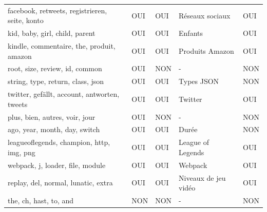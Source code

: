\begin{longtable}{lllll}
\scriptsize facebook, retweets, registrieren, seite, konto     & \cellcolor[HTML]{9AFF99}OUI & \cellcolor[HTML]{9AFF99}OUI & Réseaux sociaux           & \cellcolor[HTML]{9AFF99}OUI \\
\scriptsize kid, baby, girl, child, parent                     & \cellcolor[HTML]{9AFF99}OUI & \cellcolor[HTML]{9AFF99}OUI & Enfants                   & \cellcolor[HTML]{9AFF99}OUI \\
\scriptsize kindle, commentaire, the, produit, amazon          & \cellcolor[HTML]{9AFF99}OUI & \cellcolor[HTML]{9AFF99}OUI & Produits Amazon           & \cellcolor[HTML]{9AFF99}OUI \\
\scriptsize root, size, review, id, common                     & \cellcolor[HTML]{9AFF99}OUI & \cellcolor[HTML]{FFCCC9}NON & -                         & \cellcolor[HTML]{FFCCC9}NON \\
\scriptsize string, type, return, class, json                  & \cellcolor[HTML]{9AFF99}OUI & \cellcolor[HTML]{9AFF99}OUI & Types JSON                & \cellcolor[HTML]{FFCCC9}NON \\
\scriptsize twitter, gefällt, account, antworten, tweets       & \cellcolor[HTML]{9AFF99}OUI & \cellcolor[HTML]{9AFF99}OUI & Twitter                   & \cellcolor[HTML]{9AFF99}OUI \\
\scriptsize plus, bien, autres, voir, jour                     & \cellcolor[HTML]{9AFF99}OUI & \cellcolor[HTML]{FFCCC9}NON & -                         & \cellcolor[HTML]{FFCCC9}NON \\
\scriptsize ago, year, month, day, switch                      & \cellcolor[HTML]{9AFF99}OUI & \cellcolor[HTML]{9AFF99}OUI & Durée                     & \cellcolor[HTML]{FFCCC9}NON \\
\scriptsize leagueoflegends, champion, http, img, png          & \cellcolor[HTML]{9AFF99}OUI & \cellcolor[HTML]{9AFF99}OUI & League of Legends         & \cellcolor[HTML]{9AFF99}OUI \\
\scriptsize webpack, j, loader, file, module                   & \cellcolor[HTML]{9AFF99}OUI & \cellcolor[HTML]{9AFF99}OUI & Webpack                   & \cellcolor[HTML]{9AFF99}OUI \\
\scriptsize replay, del, normal, lunatic, extra                & \cellcolor[HTML]{9AFF99}OUI & \cellcolor[HTML]{9AFF99}OUI & Niveaux de jeu vidéo      & \cellcolor[HTML]{9AFF99}OUI \\
\scriptsize the, ch, hast, to, and                             & \cellcolor[HTML]{FFCCC9}NON & \cellcolor[HTML]{FFCCC9}NON & -                         & \cellcolor[HTML]{FFCCC9}NON \\

\end{longtable}

